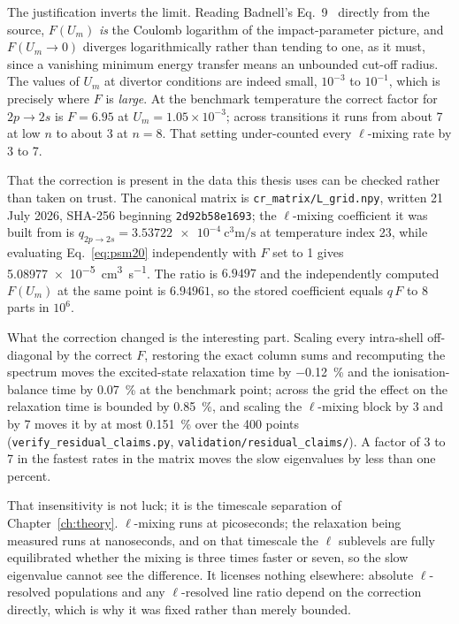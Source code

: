 The justification inverts the limit. Reading Badnell's Eq.~9~\cite{Badnell2021}
directly from the source, $F(U_m)$ \emph{is} the Coulomb logarithm of the
impact-parameter picture, and $F(U_m \to 0)$ diverges logarithmically rather than
tending to one, as it must, since a vanishing minimum energy transfer means an
unbounded cut-off radius. The values of $U_m$ at divertor conditions are indeed
small, $10^{-3}$ to $10^{-1}$, which is precisely where $F$ is \emph{large}. At
the benchmark temperature the correct factor for $2p \to 2s$ is $F = 6.95$ at
$U_m = 1.05\times10^{-3}$; across transitions it runs from about 7 at low $n$ to
about 3 at $n=8$. That setting under-counted every $\ell$-mixing rate by 3 to 7.

That the correction is present in the data this thesis uses can be checked
rather than taken on trust. The canonical matrix is
\texttt{cr\_matrix/L\_grid.npy}, written 21 July 2026, SHA-256 beginning
\texttt{2d92b58e1693}; the $\ell$-mixing coefficient it was built from is
$q_{2p\to2s} = \SI{3.53722e-4}{\cubic\centi\metre\per\second}$ at temperature
index 23, while evaluating Eq.~\eqref{eq:psm20} independently with $F$ set to 1
gives \SI{5.08977e-5}{\cubic\centi\metre\per\second}. The ratio is $6.9497$ and
the independently computed $F(U_m)$ at the same point is $6.94961$, so the
stored coefficient equals $q\,F$ to 8 parts in $10^{6}$.

What the correction changed is the interesting part. Scaling every intra-shell
off-diagonal by the correct $F$, restoring the exact column sums and recomputing
the spectrum moves the excited-state relaxation time by \SI{-0.12}{\percent} and
the ionisation-balance time by \SI{+0.07}{\percent} at the benchmark point;
across the grid the effect on the relaxation time is bounded by
\SI{0.85}{\percent}, and scaling the $\ell$-mixing block by 3 and by 7 moves it
by at most \SI{0.151}{\percent} over the 400 points
(\texttt{verify\_residual\_claims.py}, \texttt{validation/residual\_claims/}). A
factor of 3 to 7 in the fastest rates in the matrix moves the slow eigenvalues by
less than one percent.

That insensitivity is not luck; it is the timescale separation of
Chapter~\ref{ch:theory}. $\ell$-mixing runs at picoseconds; the relaxation being
measured runs at nanoseconds, and on that timescale the $\ell$ sublevels are
fully equilibrated whether the mixing is three times faster or seven, so the
slow eigenvalue cannot see the difference. It licenses nothing elsewhere:
absolute $\ell$-resolved populations and any $\ell$-resolved line ratio depend
on the correction directly, which is why it was fixed rather than merely
bounded.


